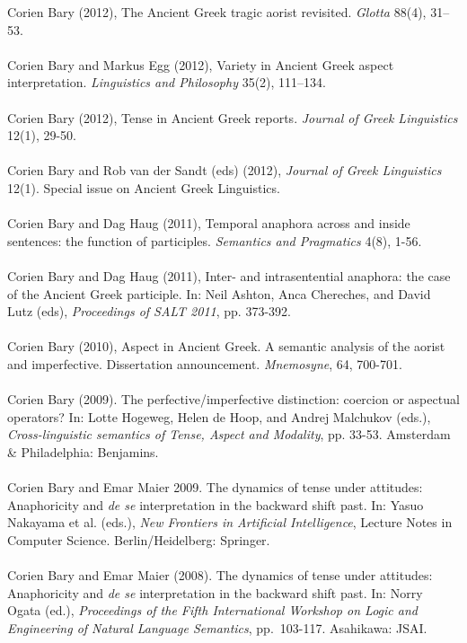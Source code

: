 \documentclass[a4paper,11pt]{article}
\begin{document}
Corien Bary (2012), The Ancient Greek tragic aorist revisited. \emph{Glotta} 88(4), 31--53.\\\\
Corien Bary and Markus Egg (2012), Variety in Ancient Greek aspect interpretation. \emph{Linguistics and Philosophy} 35(2), 111--134.\\\\
Corien Bary (2012), Tense in Ancient Greek reports. \emph{Journal of Greek Linguistics} 12(1), 29-50.\\\\
Corien Bary and Rob van der Sandt (eds) (2012), \emph{Journal of Greek Linguistics} 12(1). Special issue on Ancient Greek Linguistics.\\\\
Corien Bary and Dag Haug (2011), Temporal anaphora across and inside sentences: the function of participles. \emph{Semantics and Pragmatics} 4(8), 1-56.\\\\
Corien Bary and Dag Haug (2011), Inter- and intrasentential anaphora: the case of the Ancient Greek participle. In: Neil Ashton, Anca Chereches, and David Lutz (eds), \emph{Proceedings of SALT 2011}, pp. 373-392.\\\\
Corien Bary (2010), Aspect in Ancient Greek. A semantic analysis of the aorist and imperfective. Dissertation announcement. \emph{Mnemosyne}, 64, 700-701.\\\\
Corien Bary (2009). The perfective/imperfective distinction: coercion or aspectual operators? In: Lotte Hogeweg, Helen de Hoop, and Andrej Malchukov (eds.), \emph{Cross-linguistic semantics of Tense, Aspect and Modality}, pp. 33-53. Amsterdam \& Philadelphia: Benjamins.\\\\ 
Corien Bary and Emar Maier 2009. The dynamics of tense under attitudes: Anaphoricity and \emph{de se} interpretation in the backward shift past. In: Yasuo Nakayama et al. (eds.), \emph{New Frontiers in Artificial Intelligence}, Lecture Notes in Computer Science. Berlin/Heidelberg: Springer.\\\\ 
Corien Bary and Emar Maier (2008). The dynamics of tense under attitudes: Anaphoricity and \emph{de se} interpretation in the backward shift past. In: Norry Ogata (ed.), \emph{Proceedings of the Fifth International Workshop on Logic and Engineering of Natural Language Semantics}, pp.\ 103-117. Asahikawa: JSAI.\\\\
\end{document}

